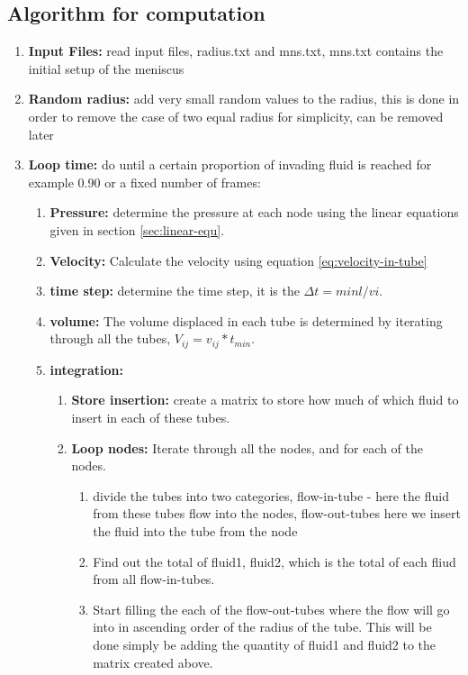 \subsection{Algorithm for computation}
	\begin{enumerate}
		\item \textbf{Input Files:} read input files, radius.txt and mns.txt, mns.txt contains the initial setup of the meniscus
		\item \textbf{Random radius:} add very small random values to the radius, this is done in order to remove the case of two equal radius for simplicity, can be removed later
		\item \textbf{Loop time:} do until a certain proportion of invading fluid is reached for example 0.90 or a fixed number of frames:
		
		\begin{enumerate}
			\item \textbf{Pressure:} determine the pressure at each node using the linear equations given in section \ref{sec:linear-equ}.
			\item \textbf{Velocity:} Calculate the velocity using equation \ref{eq:velocity-in-tube} 
			\item \textbf{time step:} determine the time step, it is the $\Delta t = min{l/v{i}}$.
			\item \textbf{volume:} The volume displaced in each tube is determined by iterating through all the tubes, $V_{ij} = v_{ij} * t_{min}$.
			\item \textbf{integration:} 
				\begin{enumerate}
				\item \textbf{Store insertion:} create a matrix to store how much of which fluid to insert in each of these tubes.
				\item \textbf{Loop nodes:} Iterate through all the nodes, and for each of the nodes. 
					\begin{enumerate}
						\item divide the tubes into two categories, flow-in-tube - here the fluid from these tubes flow into the nodes, flow-out-tubes here we insert the fluid into the tube from the node
						\item Find out the total of fluid1, fluid2, which is the total of each fliud from all flow-in-tubes.
						\item Start filling the each of the flow-out-tubes where the flow will go into in ascending order of the radius of the tube. This will be done simply be adding the quantity of fluid1 and fluid2 to the matrix created above.

\end{enumerate}
\end{enumerate}
\end{enumerate}
\end{enumerate}
